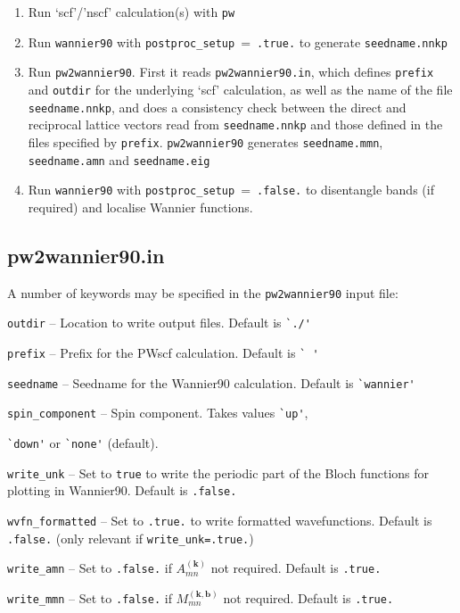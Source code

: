 \begin{enumerate}
\item Run `scf'/'nscf' calculation(s) with \verb#pw#
\item Run \verb#wannier90# with \verb#postproc_setup#~=~\verb#.true.# to
  generate \verb#seedname.nnkp#
\item Run \verb#pw2wannier90#. First it reads \verb#pw2wannier90.in#,
  which defines \verb#prefix# and \verb#outdir# for the underlying `scf'
  calculation, as well as the name of the file \verb#seedname.nnkp#,
  and does a consistency check between the direct and reciprocal lattice
  vectors read from \verb#seedname.nnkp# and those defined in the
  files specified by \verb#prefix#. \verb#pw2wannier90# generates
  \verb#seedname.mmn#, \verb#seedname.amn# and \verb#seedname.eig#
\item Run \verb#wannier90# with \verb#postproc_setup#~=~\verb#.false.# to
  disentangle bands (if required) and localise Wannier functions.
\end{enumerate}

\subsection{pw2wannier90.in}

A number of keywords may be specified in the \verb#pw2wannier90# input file:

   \verb#outdir# -- Location to write output files. Default is \verb#`./'#

   \verb#prefix# -- Prefix for the PWscf calculation. Default is \verb#` '#

   \verb#seedname# -- Seedname for the Wannier90 calculation. Default
   is \verb#`wannier'#

   \verb#spin_component# -- Spin component. Takes values \verb#`up'#,

   \verb#`down'# or \verb#`none'# (default).


   \verb#write_unk# -- Set to \verb#true# to write the periodic part
   of the Bloch functions for plotting in Wannier90. Default is
   \verb#.false.#

   \verb#wvfn_formatted# -- Set to \verb#.true.# to write formatted
   wavefunctions. Default is \verb#.false.# (only relevant if
   \verb#write_unk=.true.#)

   \verb#write_amn# -- Set to \verb#.false.# if
   $A_{mn}^{(\mathbf{k})}$ not required. Default is \verb#.true.#

   \verb#write_mmn# -- Set to \verb#.false.# if
   $M_{mn}^{(\mathbf{k,b})}$ not required. Default is \verb#.true.#
